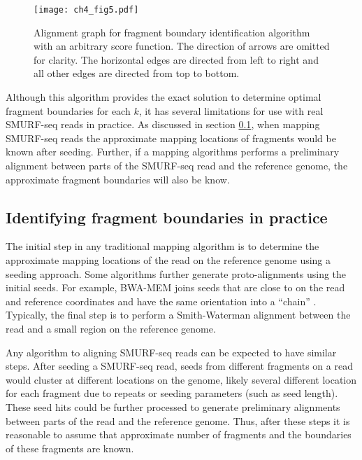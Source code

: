 \begin{figure}[h!]
\centering
\texttt{[image: ch4\_fig5.pdf]}
\caption[Alignment graph for fragment boundary identification algorithm
  with an arbitrary score function]{
  Alignment graph for fragment boundary identification algorithm
  with an arbitrary score function. The direction of arrows are omitted
  for clarity. The horizontal edges are directed from left to right and
  all other edges are directed from top to bottom.}
\label{frag_alg}
\end{figure}

Although this algorithm provides the exact solution to determine optimal
fragment boundaries for each $k$, it has several limitations for use
with real SMURF-seq reads in practice.
As discussed in section \ref{}, when mapping SMURF-seq reads the
approximate mapping locations of fragments would be known after seeding.
Further, if a mapping algorithms performs a preliminary alignment between
parts of the SMURF-seq read and the reference genome, the approximate
fragment boundaries will also be know.



\subsection{Identifying fragment boundaries in practice}
The initial step in any traditional mapping algorithm is to determine the
approximate mapping locations of the read on the reference genome using
a seeding approach.
%
Some algorithms further generate proto-alignments using the initial
seeds.
For example, BWA-MEM joins seeds that are close to on the read and
reference coordinates and have the same orientation into a ``chain''
\citep{}.
%
Typically, the final step is to perform a Smith-Waterman alignment
between the read and a small region on the reference genome.

Any algorithm to aligning SMURF-seq reads can be expected to have
similar steps. After seeding a SMURF-seq read, seeds from different
fragments on a read would cluster at different locations on the genome,
likely several different location for each fragment due to repeats or
seeding parameters (such as seed length).
%
These seed hits could be further processed to generate preliminary
alignments between parts of the read and the reference genome.
%
Thus, after these steps it is reasonable to assume that approximate
number of fragments and the boundaries of these fragments are known.

